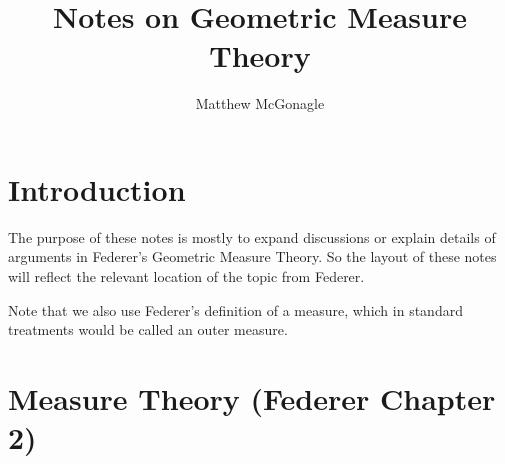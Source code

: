 \documentclass{article}
\begin{document}
\title{Notes on Geometric Measure Theory}
\author{Matthew McGonagle}
\maketitle
\section{Introduction}
The purpose of these notes is mostly to expand discussions or explain details of arguments
in Federer's Geometric Measure Theory. So the layout of these notes will reflect the relevant location
of the topic from Federer.

Note that we also use Federer's definition of a measure, which in standard treatments would be called
an outer measure.

\section{Measure Theory (Federer Chapter 2)}


\end{document}
